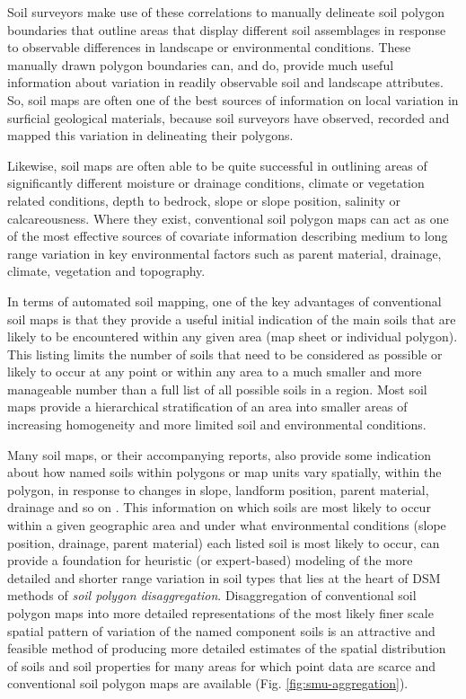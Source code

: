 \documentclass[graybox,natbib,nospthms,UStrade]{svmono}
\begin{document}
Soil surveyors make use of these correlations to manually delineate soil
polygon boundaries that outline areas that display different soil
assemblages in response to observable differences in landscape or
environmental conditions. These manually drawn polygon boundaries can,
and do, provide much useful information about variation in readily
observable soil and landscape attributes. So, soil maps are often one of
the best sources of information on local variation in surficial
geological materials, because soil surveyors have observed, recorded and
mapped this variation in delineating their polygons.

Likewise, soil maps are often able to be quite successful in outlining
areas of significantly different moisture or drainage conditions,
climate or vegetation related conditions, depth to bedrock, slope or
slope position, salinity or calcareousness. Where they exist,
conventional soil polygon maps can act as one of the most effective
sources of covariate information describing medium to long range
variation in key environmental factors such as parent material,
drainage, climate, vegetation and topography.

In terms of automated soil mapping, one of the key advantages of
conventional soil maps is that they provide a useful initial indication
of the main soils that are likely to be encountered within any given
area (map sheet or individual polygon). This listing limits the number
of soils that need to be considered as possible or likely to occur at
any point or within any area to a much smaller and more manageable
number than a full list of all possible soils in a region. Most soil
maps provide a hierarchical stratification of an area into smaller areas
of increasing homogeneity and more limited soil and environmental
conditions.

Many soil maps, or their accompanying reports, also provide some
indication about how named soils within polygons or map units vary
spatially, within the polygon, in response to changes in slope, landform
position, parent material, drainage and so on
\citep{SSDS1993, Wysocki2005Geoderma}. This information on which soils are
most likely to occur within a given geographic area and under what
environmental conditions (slope position, drainage, parent material)
each listed soil is most likely to occur, can provide a foundation for
heuristic (or expert-based) modeling of the more detailed and shorter
range variation in soil types that lies at the heart of DSM methods of
\emph{soil polygon disaggregation}. Disaggregation of conventional soil
polygon maps into more detailed representations of the most likely finer
scale spatial pattern of variation of the named component soils is an
attractive and feasible method of producing more detailed estimates of
the spatial distribution of soils and soil properties for many areas for
which point data are scarce and conventional soil polygon maps are
available (Fig. \ref{fig:smu-aggregation}).
\end{document}
